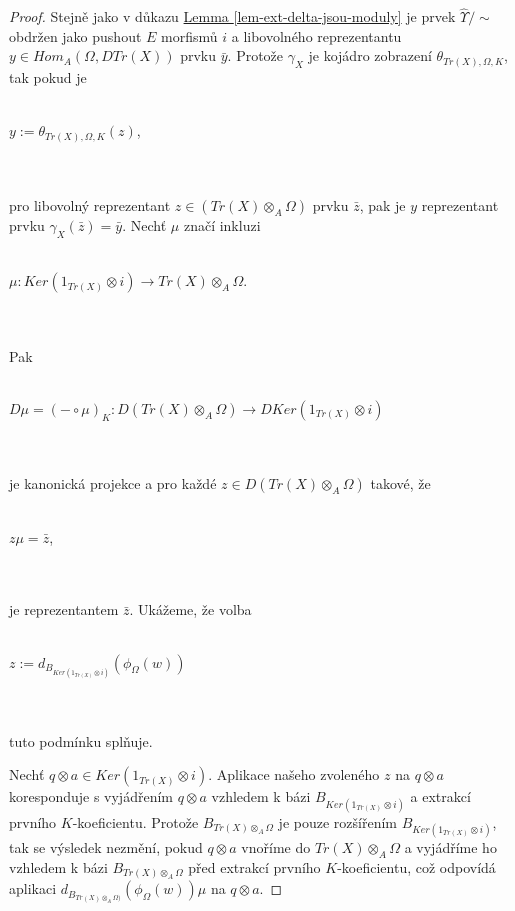 \begin{proof}
        Stejně jako v důkazu \hyperref[lem-ext-delta-jsou-moduly]{Lemma \ref*{lem-ext-delta-jsou-moduly}} 
        je prvek $\hat\Upsilon/\sim$ obdržen jako pushout $E$ morfismů $i$ a 
        libovolného reprezentantu $y\in Hom_A(\Omega, DTr(X))$ prvku $\bar y$.
        Protože $\gamma_X$ je kojádro zobrazení $\theta_{Tr(X),\Omega,K}$, tak 
        pokud je 
        \\\\\centerline{$y:=\theta_{Tr(X),\Omega,K}(z)$,}\\\\
        pro libovolný reprezentant $z\in (Tr(X)\otimes_A\Omega)$ prvku $\bar z$, 
        pak je $y$ reprezentant prvku $\gamma_X(\bar z)=\bar y$. Nechť $\mu$ 
        značí inkluzi 
        \\\\\centerline{$\mu:Ker(1_{Tr(X)}\otimes i)\to Tr(X)\otimes_A\Omega$.}\\\\
        Pak 
        \\\\\centerline{$D\mu=(-\circ\mu)_K:D(Tr(X)\otimes_A\Omega)\to DKer(1_{Tr(X)}\otimes i)$}\\\\
        je kanonická projekce a pro každé $z\in D(Tr(X)\otimes_A\Omega)$ takové, že
        \\\\\centerline{$z\mu=\bar z$,}\\\\
        je reprezentantem $\bar z$. Ukážeme, že volba
        \\\\\centerline{$z:=d_{B_{Ker(1_{Tr(X)}\otimes i)}}( \phi_\Omega(w) )$}\\\\
        tuto podmínku splňuje.
        
        Nechť $q\otimes a\in Ker(1_{Tr(X)}\otimes i)$. Aplikace našeho zvoleného $z$ 
        na $q\otimes a$ koresponduje s vyjádřením $q\otimes a$ vzhledem k bázi  
        $B_{Ker(1_{Tr(X)}\otimes i)}$
        a extrakcí prvního $K$-koeficientu. Protože $B_{Tr(X)\otimes_A\Omega}$ je 
        pouze rozšířením $B_{Ker(1_{Tr(X)}\otimes i)}$, tak se výsledek nezmění, 
        pokud $q\otimes a$ vnoříme do $Tr(X)\otimes_A \Omega$ a vyjádříme ho 
        vzhledem k bázi $B_{Tr(X)\otimes_A\Omega}$ před extrakcí prvního 
        $K$-koeficientu, což odpovídá aplikaci $d_{B_{Tr(X)\otimes_A \Omega)}}( \phi_\Omega(w) ) \mu$ 
        na $q\otimes a$.
        

\end{proof}
